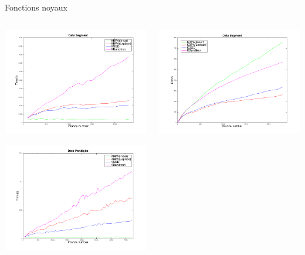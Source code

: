 \documentclass{beamer}
\begin{document}
\begin{frame}{Fonctions noyaux}
	\begin{columns}[t]
		\begin{column}{.45\linewidth}
\centerline{
	\includegraphics[width=\linewidth]{figs/Segment_kernel_T.png}}
\centerline{\includegraphics[width=\linewidth]{figs/Pendigits_kernel_T.png}}			
		\end{column}
		\begin{column}{.45\linewidth}
	\centerline{
		\includegraphics[width=\linewidth]{figs/Segment_kernel_CM.png}}

\end{column}
\end{columns}
\end{frame}
\end{document}

